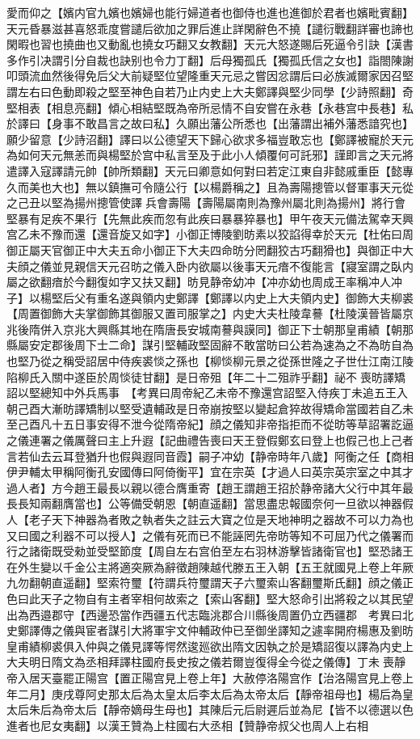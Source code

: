 愛而仰之【嬪内官九嬪也嬪婦也能行婦道者也御侍也進也進御於君者也嬪毗賓翻】天元昏暴滋甚喜怒乖度嘗譴后欲加之罪后進止詳閑辭色不撓【譴衍戰翻詳審也諦也閑暇也習也撓曲也又動亂也撓女巧翻又女教翻】天元大怒遂賜后死逼令引訣【漢書多作引决謂引分自裁也訣别也令力丁翻】后母獨孤氏【獨孤氏信之女也】詣閤陳謝叩頭流血然後得免后父大前疑堅位望隆重天元忌之嘗因忿謂后曰必族滅爾家因召堅謂左右曰色動即殺之堅至神色自若乃止内史上大夫鄭譯與堅少同學【少詩照翻】奇堅相表【相息亮翻】傾心相結堅既為帝所忌情不自安嘗在永巷【永巷宫中長巷】私於譯曰【身事不敢昌言之故曰私】久願出藩公所悉也【出藩謂出補外藩悉諳究也】願少留意【少詩沼翻】譯曰以公德望天下歸心欲求多福豈敢忘也【鄭譯被寵於天元為如何天元無恙而與楊堅於宫中私言至及于此小人傾覆何可託邪】謹即言之天元將遣譯入寇譯請元帥【帥所類翻】天元曰卿意如何對曰若定江東自非懿戚重臣【懿專久而美也大也】無以鎮撫可令隨公行【以楊爵稱之】且為壽陽摠管以督軍事天元從之己丑以堅為揚州摠管使譯兵會壽陽【壽陽屬南則為豫州屬北則為揚州】將行會堅暴有足疾不果行【先無此疾而忽有此疾曰暴暴猝暴也】甲午夜天元備法駕幸天興宫乙未不豫而還【還音旋又如字】小御正博陵劉昉素以狡諂得幸於天元【杜佑曰周御正屬天官御正中大夫五命小御正下大夫四命昉分罔翻狡古巧翻猾也】與御正中大夫顔之儀並見親信天元召昉之儀入卧内欲屬以後事天元瘖不復能言【寢室謂之臥内屬之欲翻瘖於今翻復如字又扶又翻】昉見静帝幼冲【冲亦幼也周成王率稱冲人冲子】以楊堅后父有重名遂與領内史鄭譯【鄭譯以内史上大夫領内史】御飾大夫柳裘【周置御飾大夫掌御飾其御服又置司服掌之】内史大夫杜陵韋謩【杜陵漢晉皆屬京兆後隋併入京兆大興縣其地在隋唐長安城南謩與謨同】御正下士朝那皇甫績【朝那縣屬安定郡後周下士二命】謀引堅輔政堅固辭不敢當昉曰公若為速為之不為昉自為也堅乃從之稱受詔居中侍疾裘惔之孫也【柳惔柳元景之從孫世隆之子世仕江南江陵陷柳氏入關中遂臣於周惔徒甘翻】是日帝殂【年二十二殂祚乎翻】祕不喪昉譯矯詔以堅總知中外兵馬事　【考異曰周帝紀乙未帝不豫還宫詔堅入侍疾丁未追五王入朝己酉大漸昉譯矯制以堅受遺輔政是日帝崩按堅以變起倉猝故得矯命當國若自乙未至己酉凡十五日事安得不泄今從隋帝紀】顔之儀知非帝指拒而不從昉等草詔署訖逼之儀連署之儀厲聲曰主上升遐【記曲禮告喪曰天王登假鄭玄曰登上也假己也上己者言若仙去云耳登猶升也假與遐同音霞】嗣子冲幼【静帝時年八歲】阿衡之任【商相伊尹輔太甲稱阿衡孔安國傳曰阿倚衡平】宜在宗英【才過人曰英宗英宗室之中其才過人者】方今趙王最長以親以德合膺重寄【趙王謂趙王招於静帝諸大父行中其年最長長知兩翻膺當也】公等備受朝恩【朝直遥翻】當思盡忠報國奈何一旦欲以神器假人【老子天下神器為者敗之執者失之註云大寶之位是天地神明之器故不可以力為也又曰國之利器不可以授人】之儀有死而已不能誣罔先帝昉等知不可屈乃代之儀署而行之諸衛既受勑並受堅節度【周自左右宫伯至左右羽林游擊皆諸衛官也】堅恐諸王在外生變以千金公主將適突厥為辭徵趙陳越代滕五王入朝【五王就國見上卷上年厥九勿翻朝直遥翻】堅索符璽【符謂兵符璽謂天子六璽索山客翻璽斯氏翻】顔之儀正色曰此天子之物自有主者宰相何故索之【索山客翻】堅大怒命引出將殺之以其民望出為西邉郡守【西邊恐當作西疆五代志臨洮郡合川縣後周置仍立西疆郡　考異曰北史鄭譯傳之儀與宦者謀引大將軍宇文仲輔政仲已至御坐譯知之遽率開府楊惠及劉昉皇甫績柳裘俱入仲與之儀見譯等愕然逡廵欲出隋文因執之於是矯詔復以譯為内史上大夫明日隋文為丞相拜譯柱國府長史按之儀若爾豈復得全今從之儀傳】丁未喪靜帝入居天臺罷正陽宫【置正陽宫見上卷上年】大赦停洛陽宫作【治洛陽宫見上卷上年二月】庚戌尊阿史那太后為太皇太后李太后為太帝太后【靜帝祖母也】楊后為皇太后朱后為帝太后【靜帝嫡母生母也】其陳后元后尉遲后並為尼【皆不以德選以色進者也尼女夷翻】以漢王贊為上柱國右大丞相【贊静帝叔父也周人上右相
